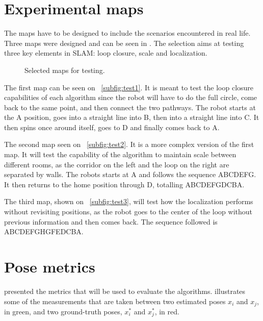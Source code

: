 \section{Experimental maps}\label{sec:selecting_maps}

The maps have to be designed to include the scenarios encountered in real life. Three maps were designed and can be seen in . The selection aims at testing three key elements in SLAM: loop closure, scale and localization.

\begin{figure}[!ht]
     \centering
     \caption{Selected maps for testing.}
     \label{fig:generated_maps}
\end{figure}

The first map can be seen on \figurename~\ref{subfig:test1}. It is meant to test the loop closure capabilities of each algorithm since the robot will have to do the full circle, come back to the same point, and then connect the two pathways. The robot starts at the A position, goes into a straight line into B, then into a straight line into C. It then spins once around itself, goes to D and finally comes back to A.

The second map seen on \figurename~\ref{subfig:test2}. It is a more complex version of the first map. It will test the capability of the algorithm to maintain scale between different rooms, as the corridor on the left and the loop on the right are separated by walls. The robots starts at A and follows the sequence ABCDEFG. It then returns to the home position through D, totalling ABCDEFGDCBA.

The third map, shown on \figurename~\ref{subfig:test3}, will test how the localization performs without revisiting positions, as the robot goes to the center of the loop without previous information and then comes back. The sequence followed is ABCDEFGHGFEDCBA.

\section{Pose metrics} \label{sec:metrics}

 presented the metrics that will be used to evaluate the algorithms.  illustrates some of the measurements that are taken between two estimated poses $x_i$ and $x_j$, in green, and two ground-truth poses, $x_i^*$ and $x_j^*$, in red.

